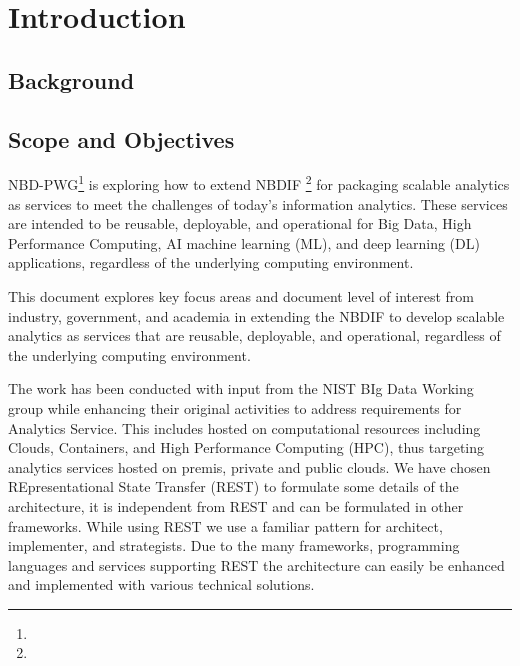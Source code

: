 
\newcommand{\WG}{\TODO{Wo: define name of wrking group}{WORKINGGROUP}}

\section{Introduction}


\subsection{Background}



\subsection{Scope and Objectives}

NBD-PWG\footnote{} is exploring how to extend
NBDIF \footnote{} for packaging scalable analytics as services to meet the
challenges of today's information analytics. These services are
intended to be reusable, deployable, and operational for Big Data,
High Performance Computing, AI machine learning (ML), and deep
learning (DL) applications, regardless of the underlying computing
environment.

This document explores key focus areas and document level of interest
from industry, government, and academia in extending the NBDIF to
develop scalable analytics as services that are reusable, deployable,
and operational, regardless of the underlying computing environment.


The work has been conducted with input from the NIST BIg Data Working
group while enhancing their original activities to address
requirements for Analytics Service. This includes hosted on
computational resources including Clouds, Containers, and High
Performance Computing (HPC), thus targeting analytics services hosted
on premis, private and public clouds. We have chosen REpresentational
State Transfer (REST) to formulate some details of the architecture,
it is independent from REST and can be formulated in other
frameworks. While using REST we use a familiar pattern for architect,
implementer, and strategists. Due to the many frameworks, programming
languages and services supporting REST the architecture can easily be
enhanced and implemented with various technical solutions.


